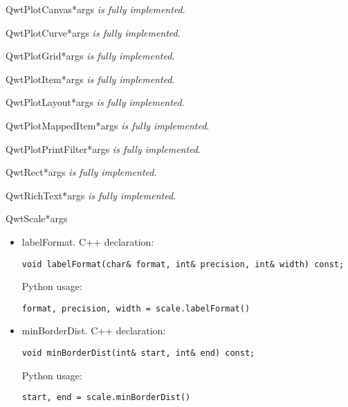 \documentclass{manual}
\begin{document}
\begin{classdesc}{QwtPlotCanvas}{*args}
\emph{is fully implemented}.
\end{classdesc}

\begin{classdesc}{QwtPlotCurve}{*args}
\emph{is fully implemented}.
\end{classdesc}

\begin{classdesc}{QwtPlotGrid}{*args}
\emph{is fully implemented}.
\end{classdesc}

\begin{classdesc}{QwtPlotItem}{*args}
\emph{is fully implemented}.
\end{classdesc}

\begin{classdesc}{QwtPlotLayout}{*args}
\emph{is fully implemented}.
\end{classdesc}

\begin{classdesc}{QwtPlotMappedItem}{*args}
\emph{is fully implemented}.
\end{classdesc}

\begin{classdesc}{QwtPlotPrintFilter}{*args}
\emph{is fully implemented}.
\end{classdesc}

\begin{classdesc}{QwtRect}{*args}
\emph{is fully implemented}.
\end{classdesc}

\begin{classdesc}{QwtRichText}{*args}
\emph{is fully implemented}.
\end{classdesc}

\begin{classdesc}{QwtScale}{*args}

  \begin{itemize}

    \item{labelFormat}. C++ declaration:
      \begin{verbatim}
void labelFormat(char& format, int& precision, int& width) const;
      \end{verbatim}
      Python usage:
      \begin{verbatim}
format, precision, width = scale.labelFormat()
      \end{verbatim}

    \item{minBorderDist}. C++ declaration:
      \begin{verbatim}
void minBorderDist(int& start, int& end) const;
      \end{verbatim}
      Python usage:
      \begin{verbatim}
start, end = scale.minBorderDist()
      \end{verbatim}

  \end{itemize}
\end{classdesc}
\end{document}

